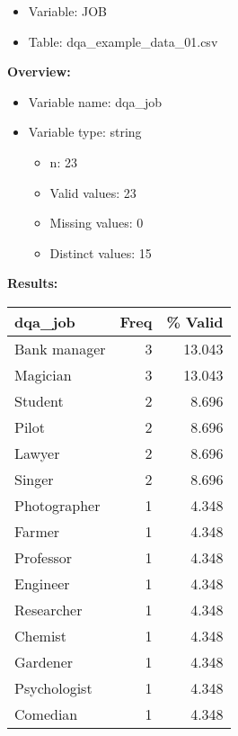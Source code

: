 \documentclass[
]{article}
\providecommand{\tightlist}{%
  \setlength{\itemsep}{0pt}\setlength{\parskip}{0pt}}
\begin{document}
\begin{itemize}
\tightlist
\item
  Variable: JOB
\item
  Table: dqa\_example\_data\_01.csv
\end{itemize}

\textbf{Overview:}

\begin{itemize}
\tightlist
\item
  Variable name: dqa\_job
\item
  Variable type: string

  \begin{itemize}
  \tightlist
  \item
    n: 23
  \item
    Valid values: 23
  \item
    Missing values: 0
  \item
    Distinct values: 15
  \end{itemize}
\end{itemize}

\textbf{Results:}\\

\begin{table}[H]
\centering
\begin{tabular}{l|r|r}
\hline
\textbf{dqa\_job} & \textbf{Freq} & \textbf{\% Valid}\\
\hline
Bank manager & 3 & 13.043\\
\hline
Magician & 3 & 13.043\\
\hline
Student & 2 & 8.696\\
\hline
Pilot & 2 & 8.696\\
\hline
Lawyer & 2 & 8.696\\
\hline
Singer & 2 & 8.696\\
\hline
Photographer & 1 & 4.348\\
\hline
Farmer & 1 & 4.348\\
\hline
Professor & 1 & 4.348\\
\hline
Engineer & 1 & 4.348\\
\hline
Researcher & 1 & 4.348\\
\hline
Chemist & 1 & 4.348\\
\hline
Gardener & 1 & 4.348\\
\hline
Psychologist & 1 & 4.348\\
\hline
Comedian & 1 & 4.348\\
\hline
\end{tabular}
\end{table}
\newpage
\end{document}
